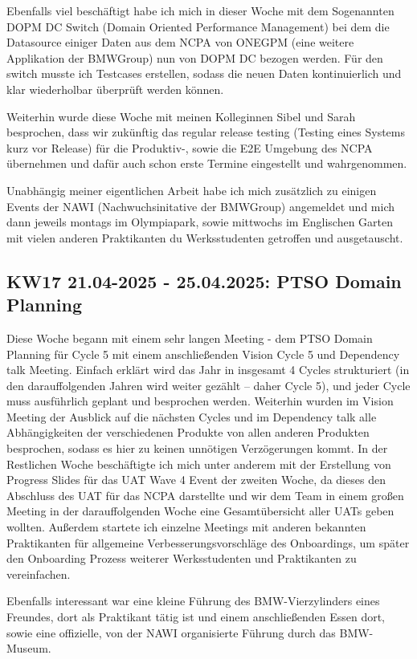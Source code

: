 Ebenfalls viel beschäftigt habe ich mich in dieser Woche mit dem Sogenannten DOPM DC Switch (Domain Oriented Performance Management) bei dem die Datasource einiger Daten aus dem NCPA von ONEGPM (eine weitere Applikation der BMWGroup) nun von DOPM DC bezogen werden. 
Für den switch musste ich Testcases erstellen, sodass die neuen Daten kontinuierlich und klar wiederholbar überprüft werden können.

Weiterhin wurde diese Woche mit meinen Kolleginnen Sibel und Sarah besprochen, dass wir zukünftig das regular release testing (Testing eines Systems kurz vor Release) für die Produktiv-, sowie die E2E Umgebung des NCPA übernehmen und dafür auch schon erste Termine eingestellt und wahrgenommen.

Unabhängig meiner eigentlichen Arbeit habe ich mich zusätzlich zu einigen Events der NAWI (Nachwuchsinitative der BMWGroup) angemeldet und mich dann jeweils montags im Olympiapark, sowie mittwochs im Englischen Garten mit vielen anderen Praktikanten du Werksstudenten getroffen und ausgetauscht.


\subsection{KW17 21.04-2025 - 25.04.2025: PTSO Domain Planning}
Diese Woche begann mit einem sehr langen Meeting - dem PTSO Domain Planning für Cycle 5 mit einem anschließenden Vision Cycle 5 und Dependency talk Meeting. 
Einfach erklärt wird das Jahr in insgesamt 4 Cycles strukturiert (in den darauffolgenden Jahren wird weiter gezählt – daher Cycle 5), und jeder Cycle muss ausführlich geplant und besprochen werden. 
Weiterhin wurden im Vision Meeting der Ausblick auf die nächsten Cycles und im Dependency talk alle Abhängigkeiten der verschiedenen Produkte von allen anderen Produkten besprochen, sodass es hier zu keinen unnötigen Verzögerungen kommt. 
In der Restlichen Woche beschäftigte ich mich unter anderem mit der Erstellung von Progress Slides für das UAT Wave 4 Event der zweiten Woche, da dieses den Abschluss des UAT für das NCPA darstellte und wir dem Team in einem großen Meeting in der darauffolgenden Woche eine Gesamtübersicht aller UATs geben wollten. 
Außerdem startete ich einzelne Meetings mit anderen bekannten Praktikanten für allgemeine Verbesserungsvorschläge des Onboardings, um später den Onboarding Prozess weiterer Werksstudenten und Praktikanten zu vereinfachen.

Ebenfalls interessant war eine kleine Führung des BMW-Vierzylinders eines Freundes, dort als Praktikant tätig ist und einem anschließenden Essen dort, sowie eine offizielle, von der NAWI organisierte Führung durch das BMW-Museum.

